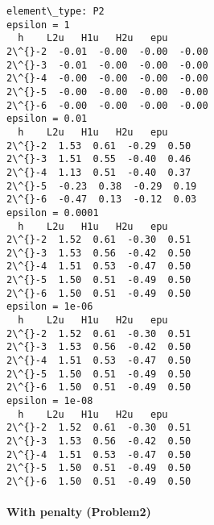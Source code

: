 \documentclass[11pt]{article}
\begin{document}
    \begin{Verbatim}[commandchars=\\\{\}]
element\_type: P2
epsilon = 1
  h    L2u   H1u   H2u   epu
2\^{}-2  -0.01  -0.00  -0.00  -0.00
2\^{}-3  -0.01  -0.00  -0.00  -0.00
2\^{}-4  -0.00  -0.00  -0.00  -0.00
2\^{}-5  -0.00  -0.00  -0.00  -0.00
2\^{}-6  -0.00  -0.00  -0.00  -0.00
epsilon = 0.01
  h    L2u   H1u   H2u   epu
2\^{}-2  1.53  0.61  -0.29  0.50
2\^{}-3  1.51  0.55  -0.40  0.46
2\^{}-4  1.13  0.51  -0.40  0.37
2\^{}-5  -0.23  0.38  -0.29  0.19
2\^{}-6  -0.47  0.13  -0.12  0.03
epsilon = 0.0001
  h    L2u   H1u   H2u   epu
2\^{}-2  1.52  0.61  -0.30  0.51
2\^{}-3  1.53  0.56  -0.42  0.50
2\^{}-4  1.51  0.53  -0.47  0.50
2\^{}-5  1.50  0.51  -0.49  0.50
2\^{}-6  1.50  0.51  -0.49  0.50
epsilon = 1e-06
  h    L2u   H1u   H2u   epu
2\^{}-2  1.52  0.61  -0.30  0.51
2\^{}-3  1.53  0.56  -0.42  0.50
2\^{}-4  1.51  0.53  -0.47  0.50
2\^{}-5  1.50  0.51  -0.49  0.50
2\^{}-6  1.50  0.51  -0.49  0.50
epsilon = 1e-08
  h    L2u   H1u   H2u   epu
2\^{}-2  1.52  0.61  -0.30  0.51
2\^{}-3  1.53  0.56  -0.42  0.50
2\^{}-4  1.51  0.53  -0.47  0.50
2\^{}-5  1.50  0.51  -0.49  0.50
2\^{}-6  1.50  0.51  -0.49  0.50
    \end{Verbatim}

    \paragraph{With penalty (Problem2)}\label{with-penalty-problem2}
\end{document}
